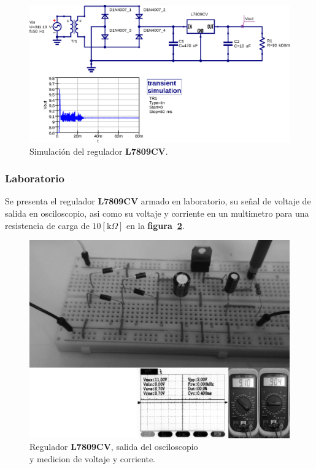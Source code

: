 \begin{figure}[!h]
\centering
\includegraphics[scale=0.75]{simulacion/09.regulador1.eps}
\caption{Simulación del regulador \textbf{L7809CV}.}
\label{simulacion09}
\end{figure}

\subsubsection{Laboratorio}
Se presenta el regulador \textbf{L7809CV} armado en laboratorio, su señal de
voltaje de salida en osciloscopio, asi como su voltaje y corriente en un
multimetro para una resistencia de carga de $10[\text{k}\Omega]$ en la
\textbf{figura~\ref{laboratorio11}}.

\begin{figure}[!h]
\centering
\includegraphics[scale=0.28]{fotos/09.regulador1.eps}
\caption{Regulador \textbf{L7809CV}, salida del osciloscopio\\
y medicion de voltaje y corriente.}
\label{laboratorio11}
\end{figure}

